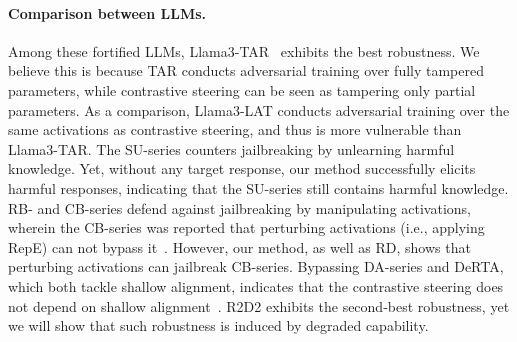 \documentclass{article}
\theoremstyle{plain}
\theoremstyle{definition}
\theoremstyle{remark}
\begin{document}
\paragraph{Comparison between LLMs.} Among these fortified LLMs, Llama3-TAR~\cite{tar} exhibits the best robustness. We believe this is because TAR conducts adversarial training over fully tampered parameters, while contrastive steering can be seen as tampering only partial parameters. As a comparison, Llama3-LAT conducts adversarial training over the same activations as contrastive steering, and thus is more vulnerable than Llama3-TAR. The SU-series counters jailbreaking by unlearning harmful knowledge. Yet, without any target response, our method successfully elicits harmful responses, indicating that the SU-series still contains harmful knowledge. RB- and CB-series defend against jailbreaking by manipulating activations, wherein the CB-series was reported that perturbing activations (i.e., applying RepE) can not bypass it~\cite{circuitBreaker}. However, our method, as well as RD, shows that perturbing activations can jailbreak CB-series. Bypassing DA-series and DeRTA, which both tackle shallow alignment, indicates that the contrastive steering does not depend on shallow alignment~\cite{shallow}. R2D2 exhibits the second-best robustness, yet we will show that such robustness is induced by degraded capability.
\end{document}
